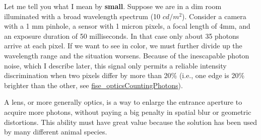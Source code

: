 \documentclass[
  letterpaper,
]{book}
\begin{document}
Let me tell you what I mean by \textbf{small}. Suppose we are in a dim
room illuminated with a broad wavelength spectrum (10 \(cd/m^2\)).
Consider a camera with a 1 mm pinhole, a sensor with 1 micron pixels, a
focal length of 4mm, and an exposure duration of 50 milliseconds. In
that case only about 35 photons arrive at each pixel. If we want to see
in color, we must further divide up the wavelength range and the
situation worsens. Because of the inescapable photon noise, which I
describe later, this signal only permits a reliable intensity
discrimination when two pixels differ by more than 20\% (i.e., one edge
is 20\% brighter than the other, see
\href{../code/fise_opticsCountingPhotons.html}{fise\_opticsCountingPhotons}).

A lens, or more generally optics, is a way to enlarge the entrance
aperture to acquire more photons, without paying a big penalty in
spatial blur or geometric distortions. This ability must have great
value because the solution has been used by many different animal
species.
\end{document}
